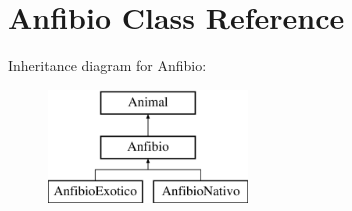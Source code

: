 \hypertarget{class_anfibio}{}\section{Anfibio Class Reference}
\label{class_anfibio}
Inheritance diagram for Anfibio\+:\begin{figure}[H]
\begin{center}
\leavevmode
\includegraphics[height=3.000000cm]{class_anfibio}
\end{center}
\end{figure}
